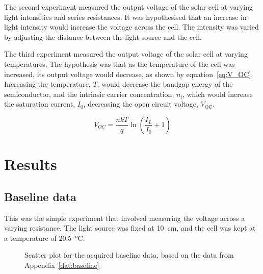 \documentclass[a4paper,11pt]{article}
\begin{document}
The second experiment measured the output voltage of the solar cell at varying light intensities and series resistances. It was hypothesised that an increase in light intensity would increase the voltage across the cell. The intensity was varied by adjusting the distance between the light source and the cell.

The third experiment measured the output voltage of the solar cell at varying temperatures. The hypothesis was that as the temperature of the cell was increased, its output voltage would decrease, as shown by equation~\ref{eq:V_OC}. Increasing the temperature, $T$, would decrease the bandgap energy of the semiconductor, and the intrinsic carrier concentration, $n_{\textrm{i}}$, which would increase the saturation current, $I_0$, decreasing the open circuit voltage, $V_{\textrm{OC}}$.

\begin{equation} \label{eq:V_OC}
V_{OC} = \frac{nkT}{q}\ln{\left(\frac{I_L}{I_0} + 1\right)}
\end{equation}


\section{Results}
\subsection{Baseline data}

This was the simple experiment that involved measuring the voltage across a varying resistance. The light source was fixed at \SI{10}{\centi\metre}, and the cell was kept at a temperature of \SI{20.5}{\celsius}.

\begin{figure}[h]
\caption{Scatter plot for the acquired baseline data, based on the data from Appendix~\ref{dat:baseline}}
\label{plot:baseline}
\end{figure}
\end{document}
